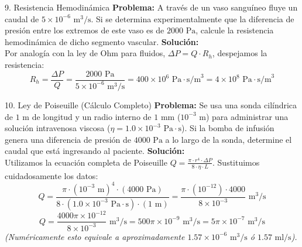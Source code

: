 \documentclass[12pt,letterpaper]{article}
\begin{document}
\vspace{0.3cm}
\begin{infobox}{9. Resistencia Hemodinámica}
    \textbf{Problema:} A través de un vaso sanguíneo fluye un caudal de $5 \times 10^{-6} \text{ m}^3\text{/s}$. Si se determina experimentalmente que la diferencia de presión entre los extremos de este vaso es de $2000 \text{ Pa}$, calcule la resistencia hemodinámica de dicho segmento vascular.
    \tcblower
    \textbf{Solución:}\\
    Por analogía con la ley de Ohm para fluidos, $\Delta P = Q \cdot R_h$, despejamos la resistencia:
    \[
    R_h = \frac{\Delta P}{Q} = \frac{2000 \text{ Pa}}{5 \times 10^{-6} \text{ m}^3\text{/s}} = 400 \times 10^6 \text{ Pa}\cdot\text{s/m}^3 = 4 \times 10^8 \text{ Pa}\cdot\text{s/m}^3
    \]
\end{infobox}

\vspace{0.3cm}
\begin{infobox}{10. Ley de Poiseuille (Cálculo Completo)}
    \textbf{Problema:} Se usa una sonda cilíndrica de $1 \text{ m}$ de longitud y un radio interno de $1 \text{ mm}$ ($10^{-3} \text{ m}$) para administrar una solución intravenosa viscosa ($\eta = 1.0 \times 10^{-3} \text{ Pa}\cdot\text{s}$). Si la bomba de infusión genera una diferencia de presión de $4000 \text{ Pa}$ a lo largo de la sonda, determine el caudal que está ingresando al paciente.
    \tcblower
    \textbf{Solución:}\\
    Utilizamos la ecuación completa de Poiseuille $Q = \frac{\pi \cdot r^4 \cdot \Delta P}{8 \cdot \eta \cdot L}$. Sustituimos cuidadosamente los datos:
    \[
    Q = \frac{\pi \cdot (10^{-3} \text{ m})^4 \cdot (4000 \text{ Pa})}{8 \cdot (1.0 \times 10^{-3} \text{ Pa}\cdot\text{s}) \cdot (1 \text{ m})} = \frac{\pi \cdot (10^{-12}) \cdot 4000}{8 \times 10^{-3}} \text{ m}^3\text{/s}
    \]
    \[
    Q = \frac{4000\pi \times 10^{-12}}{8 \times 10^{-3}} \text{ m}^3\text{/s} = 500\pi \times 10^{-9} \text{ m}^3\text{/s} = 5\pi \times 10^{-7} \text{ m}^3\text{/s}
    \]
    \textit{(Numéricamente esto equivale a aproximadamente $1.57 \times 10^{-6} \text{ m}^3\text{/s}$ ó $1.57 \text{ ml/s}$).}
\end{infobox}
\end{document}
